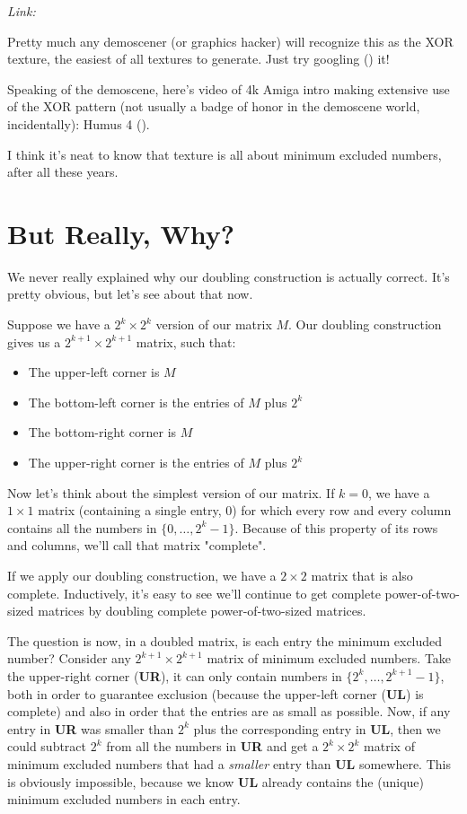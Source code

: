 \documentclass[11pt]{article}
\begin{document}
\textit{Link: }\texttt{}

Pretty much any demoscener (or graphics hacker) will recognize this as the XOR texture, the easiest of all textures to generate. Just try googling (\texttt{}) it!

Speaking of the demoscene, here's video of 4k Amiga intro making extensive use of the XOR pattern (not usually a badge of honor in the demoscene world, incidentally): Humus 4 (\texttt{}).

I think it's neat to know that texture is all about minimum excluded numbers, after all these years.
\section{But Really, Why?}

We never really explained why our doubling construction is actually correct. It's pretty obvious, but let's see about that now.

Suppose we have a $2^k \times 2^k$ version of our matrix $M$. Our doubling construction gives us a $2^{k+1} \times 2^{k+1}$ matrix, such that:
\begin{itemize}
\item The upper-left corner is $M$
\item The bottom-left corner is the entries of $M$ plus $2^k$
\item The bottom-right corner is $M$
\item The upper-right corner is the entries of $M$ plus $2^k$
\end{itemize}

Now let's think about the simplest version of our matrix. If $k = 0$, we have a $1 \times 1$ matrix (containing a single entry, 0) for which every row and every column contains all the numbers in $\lbrace 0, \ldots, 2^k - 1\rbrace$. Because of this property of its rows and columns, we'll call that matrix "complete".

If we apply our doubling construction, we have a $2 \times 2$ matrix that is also complete. Inductively, it's easy to see we'll continue to get complete power-of-two-sized matrices by doubling complete power-of-two-sized matrices.

The question is now, in a doubled matrix, is each entry the minimum excluded number? Consider any $2^{k + 1} \times 2^{k + 1}$ matrix of minimum excluded numbers. Take the upper-right corner (\textbf{UR}), it can only contain numbers in $\lbrace 2^k, \ldots, 2^{k + 1} - 1 \rbrace$, both in order to guarantee exclusion (because the upper-left corner (\textbf{UL}) is complete) and also in order that the entries are as small as possible. Now, if any entry in \textbf{UR} was smaller than $2^k$ plus the corresponding entry in \textbf{UL}, then we could subtract $2^k$ from all the numbers in \textbf{UR} and get a $2^k \times 2^k$ matrix of minimum excluded numbers that had a \emph{smaller} entry than \textbf{UL} somewhere. This is obviously impossible, because we know \textbf{UL} already contains the (unique) minimum excluded numbers in each entry.
\end{document}
